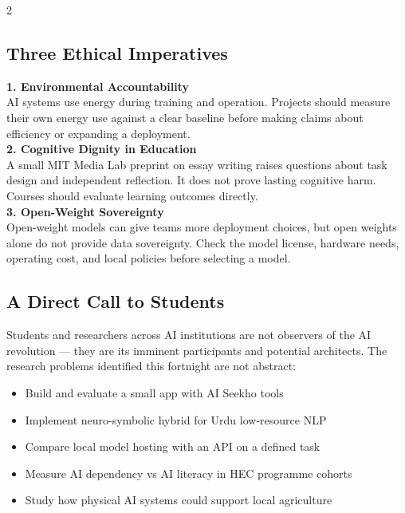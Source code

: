 \documentclass[10pt, a4paper]{article}
\begin{document}
\begin{multicols}{2}
\subsection{Three Ethical Imperatives}

\begin{alertbox}[title={\faBalanceScale\quad Non-Negotiable Principles}]
  {\small
  \textbf{1. Environmental Accountability}\\
  AI systems use energy during training and operation. Projects should measure their own energy use against a clear baseline before making claims about efficiency or expanding a deployment.\\[6.5pt]

  \textbf{2. Cognitive Dignity in Education}\\
  A small MIT Media Lab preprint on essay writing raises questions about task design and independent reflection. It does not prove lasting cognitive harm. Courses should evaluate learning outcomes directly.\\[7.5pt]

  \textbf{3. Open-Weight Sovereignty}\\
  Open-weight models can give teams more deployment choices, but open weights alone do not provide data sovereignty. Check the model license, hardware needs, operating cost, and local policies before selecting a model.
  }
\end{alertbox}


\subsection{A Direct Call to Students}

{\small
Students and researchers across AI institutions are not observers of the AI revolution --- they are its imminent participants and potential architects. The research problems identified this fortnight are not abstract:
}

\begin{insightbox}[title={\faGraduationCap\quad Actionable Research Threads}]
  \begin{itemize}[itemsep=3pt, leftmargin=*,
      label={\color{cobalt}}]
    \item {\small Build and evaluate a small app with AI Seekho tools}
    \item {\small Implement neuro-symbolic hybrid for Urdu low-resource NLP}
    \item {\small Compare local model hosting with an API on a defined task}
    \item {\small Measure AI dependency vs AI literacy in HEC programme cohorts}
    \item {\small Study how physical AI systems could support local agriculture}
  \end{itemize}
\end{insightbox}


\end{multicols}
\end{document}
